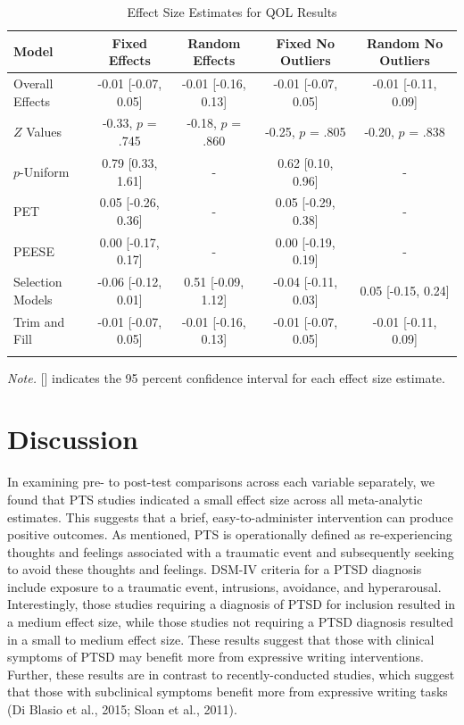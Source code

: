 \documentclass[man]{apa6}
\theoremstyle{definition}
\theoremstyle{definition}
\theoremstyle{definition}
\theoremstyle{remark}
\begin{document}
\begin{table}[tbp]
\begin{center}
\begin{threeparttable}
\caption{\label{tab:QOLtable}Effect Size Estimates for QOL Results}
\small{
\begin{tabular}{lcccc}
\toprule
Model & Fixed Effects & Random Effects & Fixed No Outliers & Random No Outliers\\
\midrule
Overall Effects & -0.01 [-0.07, 0.05] & -0.01 [-0.16, 0.13] & -0.01 [-0.07, 0.05] & -0.01 [-0.11, 0.09]\\
$Z$ Values & -0.33, $p$ = .745 & -0.18, $p$ = .860 & -0.25, $p$ = .805 & -0.20, $p$ = .838\\
$p$-Uniform & 0.79 [0.33, 1.61] & - & 0.62 [0.10, 0.96] & -\\
PET & 0.05 [-0.26, 0.36] & - & 0.05 [-0.29, 0.38] & -\\
PEESE & 0.00 [-0.17, 0.17] & - & 0.00 [-0.19, 0.19] & -\\
Selection Models & -0.06 [-0.12, 0.01] & 0.51 [-0.09, 1.12] & -0.04 [-0.11, 0.03] & 0.05 [-0.15, 0.24]\\
Trim and Fill & -0.01 [-0.07, 0.05] & -0.01 [-0.16, 0.13] & -0.01 [-0.07, 0.05] & -0.01 [-0.11, 0.09]\\
\bottomrule
\addlinespace
\end{tabular}
}
\begin{tablenotes}[para]
\textit{Note.} [] indicates the 95 percent confidence interval for each effect size estimate.
\end{tablenotes}
\end{threeparttable}
\end{center}
\end{table}

\section{Discussion}\label{discussion}

In examining pre- to post-test comparisons across each variable
separately, we found that PTS studies indicated a small effect size
across all meta-analytic estimates. This suggests that a brief,
easy-to-administer intervention can produce positive outcomes. As
mentioned, PTS is operationally defined as re-experiencing thoughts and
feelings associated with a traumatic event and subsequently seeking to
avoid these thoughts and feelings. DSM-IV criteria for a PTSD diagnosis
include exposure to a traumatic event, intrusions, avoidance, and
hyperarousal. Interestingly, those studies requiring a diagnosis of PTSD
for inclusion resulted in a medium effect size, while those studies not
requiring a PTSD diagnosis resulted in a small to medium effect size.
These results suggest that those with clinical symptoms of PTSD may
benefit more from expressive writing interventions. Further, these
results are in contrast to recently-conducted studies, which suggest
that those with subclinical symptoms benefit more from expressive
writing tasks (Di Blasio et al., 2015; Sloan et al., 2011).
\end{document}
